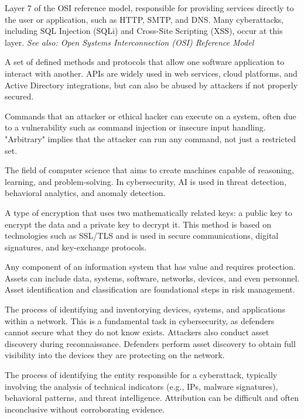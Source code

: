  Layer 7 of the OSI reference model, responsible for providing services directly to the user or application, such as HTTP, SMTP, and DNS. Many cyberattacks, including SQL Injection (SQLi) and Cross-Site Scripting (XSS), occur at this layer.
\textit{See also: Open Systems Interconnection (OSI) Reference Model}

 A set of defined methods and protocols that allow one software application to interact with another. APIs are widely used in web services, cloud platforms, and Active Directory integrations, but can also be abused by attackers if not properly secured.

 Commands that an attacker or ethical hacker can execute on a system, often due to a vulnerability such as command injection or insecure input handling. "Arbitrary" implies that the attacker can run any command, not just a restricted set.

 The field of computer science that aims to create machines capable of reasoning, learning, and problem-solving. In cybersecurity, AI is used in threat detection, behavioral analytics, and anomaly detection.

 A type of encryption that uses two mathematically related keys: a public key to encrypt the data and a private key to decrypt it. This method is based on technologies such as SSL/TLS and is used in secure communications, digital signatures, and key-exchange protocols.

 Any component of an information system that has value and requires protection. Assets can include data, systems, software, networks, devices, and even personnel. Asset identification and classification are foundational steps in risk management.

 The process of identifying and inventorying devices, systems, and applications within a network. This is a fundamental task in cybersecurity, as defenders cannot secure what they do not know exists. Attackers also conduct asset discovery during reconnaissance. Defenders perform asset discovery to obtain full visibility into the devices they are protecting on the network.

 The process of identifying the entity responsible for a cyberattack, typically involving the analysis of technical indicators (e.g., IPs, malware signatures), behavioral patterns, and threat intelligence. Attribution can be difficult and often inconclusive without corroborating evidence.


